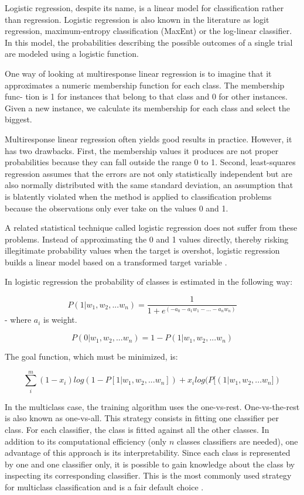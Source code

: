 \documentclass[12pt]{report}
\begin{document}
Logistic regression, despite its name, is a linear model for classification rather than regression. Logistic regression is also known in the literature as logit regression, maximum-entropy classification (MaxEnt) or the log-linear classifier. In this model, the probabilities describing the possible outcomes of a single trial are modeled using a logistic function.

One way of looking at multiresponse linear regression is to imagine that it approximates a numeric membership function for each class. The membership func- tion is 1 for instances that belong to that class and 0 for other instances. Given a new instance, we calculate its membership for each class and select the biggest.

Multiresponse linear regression often yields good results in practice. However, it has two drawbacks. First, the membership values it produces are not proper probabilities because they can fall outside the range 0 to 1. Second, least-squares regression assumes that the errors are not only statistically independent but are also normally distributed with the same standard deviation, an assumption that is blatently violated when the method is applied to classification problems because the observations only ever take on the values 0 and 1.

A related statistical technique called logistic regression does not suffer from these problems. Instead of approximating the 0 and 1 values directly, thereby risking illegitimate probability values when the target is overshot, logistic regression builds a linear model based on a transformed target variable \cite{Witten and Frank}.

In logistic regression the probability of classes is estimated in the following way:

$$P(1 | w_1, w_2, ... w_n) = \dfrac{1}{1 + e^(-a_0 - a_1 w_1 - ... - a_n w_n)}$$
- where $a_i$ is weight.

$$P(0 | w_1, w_2, ... w_n) = 1 - P(1 | w_1, w_2, ... w_n)$$

The goal function, which must be minimized, is:

$$\sum_{i}^{m} {(1 - x_i) log(1 - P[1 | w_1, w_2, ... w_n]) + x_i log(P[(1 | w_1, w_2, ... w_n])}$$

In the multiclass case, the training algorithm uses the one-vs-rest. One-vs-the-rest is also known as one-vs-all. This strategy consists in fitting one classifier per class. For each classifier, the class is fitted against all the other classes. In addition to its computational efficiency (only $n$ classes classifiers are needed), one advantage of this approach is its interpretability. Since each class is represented by one and one classifier only, it is possible to gain knowledge about the class by inspecting its corresponding classifier. This is the most commonly used strategy for multiclass classification and is a fair default choice \cite{McKinney}.
\end{document}

